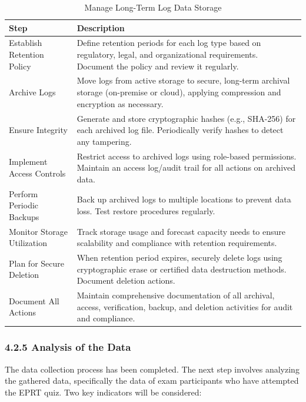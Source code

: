 \begin{table}[H]
	\centering
	\caption{Manage Long-Term Log Data Storage}
	\begin{tabular}{|p{4cm}|p{9cm}|}
		\hline
		\textbf{Step} & \textbf{Description} \\
		\hline
		Establish Retention Policy & Define retention periods for each log type based on regulatory, legal, and organizational requirements. Document the policy and review it regularly. \\
		\hline
		Archive Logs & Move logs from active storage to secure, long-term archival storage (on-premise or cloud), applying compression and encryption as necessary. \\
		\hline
		Ensure Integrity & Generate and store cryptographic hashes (e.g., SHA-256) for each archived log file. Periodically verify hashes to detect any tampering. \\
		\hline
		Implement Access Controls & Restrict access to archived logs using role-based permissions. Maintain an access log/audit trail for all actions on archived data. \\
		\hline
		Perform Periodic Backups & Back up archived logs to multiple locations to prevent data loss. Test restore procedures regularly. \\
		\hline
		Monitor Storage Utilization & Track storage usage and forecast capacity needs to ensure scalability and compliance with retention requirements. \\
		\hline
		Plan for Secure Deletion & When retention period expires, securely delete logs using cryptographic erase or certified data destruction methods. Document deletion actions. \\
		\hline
		Document All Actions & Maintain comprehensive documentation of all archival, access, verification, backup, and deletion activities for audit and compliance. \\
		\hline
	\end{tabular}
	\label{tab:long_term_log_storage}
\end{table}



\subsubsection{4.2.5 Analysis of the Data}

The data collection process has been completed. The next step involves analyzing the gathered data, specifically the data of exam participants who have attempted the EPRT quiz. Two key indicators will be considered:

